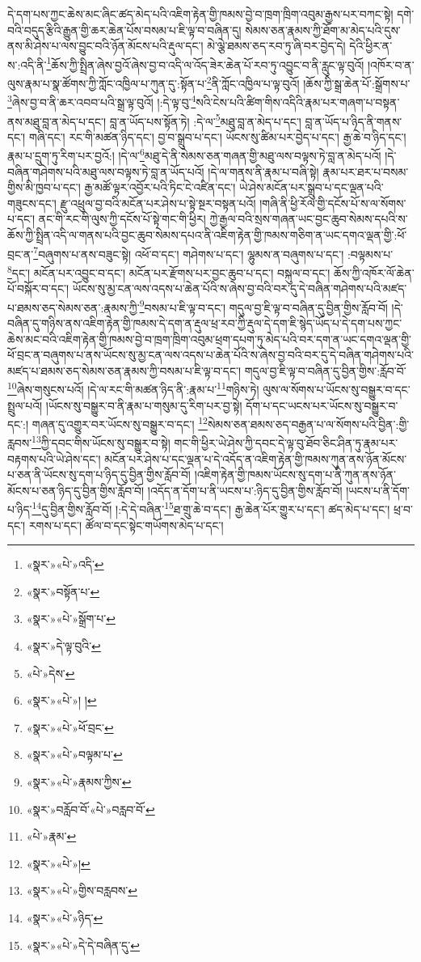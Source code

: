 དེ་དག་པས་ཀྱང་ཆེས་མང་ཞིང་ཚད་མེད་པའི་འཇིག་རྟེན་གྱི་ཁམས་བྱེ་བ་ཁྲག་ཁྲིག་འབུམ་རྒྱས་པར་བཀང་སྟེ། དགེ་བའི་བདུད་རྩིའི་རྒྱུན་གྱི་ཆར་ཆེན་པོས་བསམ་པ་ཇི་ལྟ་བ་བཞིན་དུ། སེམས་ཅན་རྣམས་ཀྱི་ཐོག་མ་མེད་པའི་དུས་ནས་མི་ཤེས་པ་ལས་བྱུང་བའི་ཉོན་མོངས་པའི་རྡུལ་དང་། མེ་ལྕེ་ཐམས་ཅད་རབ་ཏུ་ཞི་བར་བྱེད་དེ། དེའི་ཕྱིར་ན་ས་:འདི་ནི་\footnote{«སྣར་»«པེ་»འདི་}ཆོས་ཀྱི་སྤྲིན་ཞེས་བྱའོ་ཞེས་བྱ་བ་འདི་ལ་འོད་ཟེར་ཆེན་པོ་རབ་ཏུ་འབྱུང་བ་ནི་རླུང་ལྟ་བུའོ། །འཁོར་བ་ན་ལུས་རྣམ་པ་སྣ་ཚོགས་ཀྱི་ཀློང་འཁྱིལ་པ་ཀུན་དུ་:སྟོན་པ་\footnote{«སྣར་»བསྟོན་པ་}ནི་ཀློང་འཁྱིལ་པ་ལྟ་བུའོ། །ཆོས་ཀྱི་སྒྲ་ཆེན་པོ་:སྒྲོགས་པ་\footnote{«སྣར་»«པེ་»སྒྲོག་པ་}ཞེས་བྱ་བ་ནི་ཆར་འབབ་པའི་སྒྲ་ལྟ་བུའོ། །:དེ་ལྟ་བུ་\footnote{«སྣར་»དེ་ལྟ་བུའི་}སའི་ངེས་པའི་ཚིག་གིས་འདིའི་རྣམ་པར་གཞག་པ་བསྟན་ནས་མཐུ་བླ་ན་མེད་པ་དང་། བླ་ན་ཡོད་པས་སྟོན་ཏེ། :དེ་ལ་\footnote{«པེ་»དེས་}མཐུ་བླ་ན་མེད་པ་དང་། བླ་ན་ཡོད་པ་ཉིད་ནི་གནས་དང་། གཞི་དང་། རང་གི་མཚན་ཉིད་དང་། བྱ་བ་སྒྲུབ་པ་དང་། ཡོངས་སུ་ཚིམ་པར་བྱེད་པ་དང་། རྒྱ་ཆེ་བ་ཉིད་དང་། རྣམ་པ་དྲུག་ཏུ་རིག་པར་བྱའོ:། །དེ་ལ་\footnote{«སྣར་»«པེ་»། །}མཐུ་དེ་ནི་སེམས་ཅན་གཞན་གྱི་མཐུ་ལས་བལྟས་ཏེ་བླ་ན་མེད་པའོ། །དེ་བཞིན་གཤེགས་པའི་མཐུ་ལས་བལྟས་ཏེ་བླ་ན་ཡོད་པའོ། །དེ་ལ་གནས་ནི་རྣམ་པ་བཞི་སྟེ། རྣམ་པར་ཐར་པ་བསམ་གྱིས་མི་ཁྱབ་པ་དང་། རྒྱ་མཚོ་ལྟར་འབྱོར་པའི་ཏིང་ངེ་འཛིན་དང་། ཡེ་ཤེས་མངོན་པར་སྒྲུབ་པ་དང་ལྡན་པའི་གཟུངས་དང་། རྫུ་འཕྲུལ་བྱ་བའི་མངོན་པར་ཤེས་པ་སྟེ་སྔར་བསྟན་པའོ། །གཞི་ནི་ཕྱི་རོལ་གྱི་དངོས་པོ་ས་ལ་སོགས་པ་དང་། ནང་གི་རང་གི་ལུས་ཀྱི་དངོས་པོ་སྟེ་གང་གི་ཕྱིར། ཀྱེ་རྒྱལ་བའི་སྲས་གཞན་ཡང་བྱང་ཆུབ་སེམས་དཔའི་ས་ཆོས་ཀྱི་སྤྲིན་འདི་ལ་གནས་པའི་བྱང་ཆུབ་སེམས་དཔའ་ནི་འཇིག་རྟེན་གྱི་ཁམས་གཅིག་ན་ཡང་དགའ་ལྡན་གྱི་:ཕོ་བྲང་ན་\footnote{«སྣར་»«པེ་»ཕོ་བྲང་}བཞུགས་པ་ནས་བཟུང་སྟེ། འཕོ་བ་དང་། གཤེགས་པ་དང་། ལྷུམས་ན་བཞུགས་པ་དང་། :བལྟམས་པ་\footnote{«སྣར་»«པེ་»བལྟམ་པ་}དང་། མངོན་པར་འབྱུང་བ་དང་། མངོན་པར་རྫོགས་པར་བྱང་ཆུབ་པ་དང་། བསྐུལ་བ་དང་། ཆོས་ཀྱི་འཁོར་ལོ་ཆེན་པོ་བསྐོར་བ་དང་། ཡོངས་སུ་མྱ་ངན་ལས་འདས་པ་ཆེན་པོའི་ས་ཞེས་བྱ་བའི་བར་དུ་དེ་བཞིན་གཤེགས་པའི་མཛད་པ་ཐམས་ཅད་སེམས་ཅན་:རྣམས་ཀྱི་\footnote{«སྣར་»«པེ་»རྣམས་ཀྱིས་}བསམ་པ་ཇི་ལྟ་བ་དང་། གདུལ་བྱ་ཇི་ལྟ་བ་བཞིན་དུ་བྱིན་གྱིས་རློབ་བོ། །དེ་བཞིན་དུ་གཉིས་ནས་འཇིག་རྟེན་གྱི་ཁམས་དེ་དག་ན་རྡུལ་ཕྲ་རབ་ཀྱི་རྡུལ་དེ་དག་ཇི་སྙེད་ཡོད་པ་དེ་དག་པས་ཀྱང་ཆེས་མང་བའི་འཇིག་རྟེན་གྱི་ཁམས་བྱེ་བ་ཁྲག་ཁྲིག་འབུམ་ཕྲག་དཔག་ཏུ་མེད་པའི་བར་དག་ན་ཡང་དགའ་ལྡན་གྱི་ཕོ་བྲང་ན་བཞུགས་པ་ནས་ཡོངས་སུ་མྱ་ངན་ལས་འདས་པ་ཆེན་པོའི་ས་ཞེས་བྱ་བའི་བར་དུ་དེ་བཞིན་གཤེགས་པའི་མཛད་པ་ཐམས་ཅད་སེམས་ཅན་རྣམས་ཀྱི་བསམ་པ་ཇི་ལྟ་བ་དང་། གདུལ་བྱ་ཇི་ལྟ་བ་བཞིན་དུ་བྱིན་གྱིས་:རློབ་བོ་\footnote{«སྣར་»བརློབ་བོ་«པེ་»བརླབ་བོ་}ཞེས་གསུངས་པའོ། །དེ་ལ་རང་གི་མཚན་ཉིད་ནི་:རྣམ་པ་\footnote{«པེ་»རྣམ་}གཉིས་ཏེ། ལུས་ལ་སོགས་པ་ཡོངས་སུ་བསྒྱུར་བ་དང་སྤྲུལ་པའོ། །ཡོངས་སུ་བསྒྱུར་བ་ནི་རྣམ་པ་གསུམ་དུ་རིག་པར་བྱ་སྟེ། དོག་པ་དང་ཡངས་པར་ཡོངས་སུ་བསྒྱུར་བ་དང་:། གཞན་དུ་འགྱུར་བར་ཡོངས་སུ་བསྒྱུར་བ་དང་། \footnote{«སྣར་»«པེ་»།  }སེམས་ཅན་ཐམས་ཅད་བརྒྱན་པ་ལ་སོགས་པའི་བྱིན་:གྱི་རླབས་\footnote{«སྣར་»«པེ་»གྱིས་བརླབས་}ཀྱི་དབང་གིས་ཡོངས་སུ་བསྒྱུར་བ་སྟེ། གང་གི་ཕྱིར་ཡེ་ཤེས་ཀྱི་དབང་དེ་ལྟ་བུ་ཐོབ་ཅིང་ཤིན་ཏུ་རྣམ་པར་བརྟགས་པའི་ཡེ་ཤེས་དང་། མངོན་པར་ཤེས་པ་དང་ལྡན་པ་དེ་འདོད་ན་འཇིག་རྟེན་གྱི་ཁམས་ཀུན་ནས་ཉོན་མོངས་པ་ཅན་ནི་ཡོངས་སུ་དག་པ་ཉིད་དུ་བྱིན་གྱིས་རློབ་བོ། །འཇིག་རྟེན་གྱི་ཁམས་ཡོངས་སུ་དག་པ་ནི་ཀུན་ནས་ཉོན་མོངས་པ་ཅན་ཉིད་དུ་བྱིན་གྱིས་རློབ་བོ། །འདོད་ན་དོག་པ་ནི་ཡངས་པ་:ཉིད་དུ་བྱིན་གྱིས་རློབ་བོ། །ཡངས་པ་ནི་དོག་པ་ཉིད་\footnote{«སྣར་»«པེ་»ཉིད་}དུ་བྱིན་གྱིས་རློབ་བོ། །:དེ་དེ་བཞིན་\footnote{«སྣར་»«པེ་»དེ་དེ་བཞིན་དུ་}ཐ་གྲུ་ཆེ་བ་དང་། རྒྱ་ཆེན་པོར་གྱུར་པ་དང་། ཚད་མེད་པ་དང་། ཕྲ་བ་དང་། རགས་པ་དང་། ཚོལ་བ་དང་སྟེང་གཡོགས་མེད་པ་དང་། 